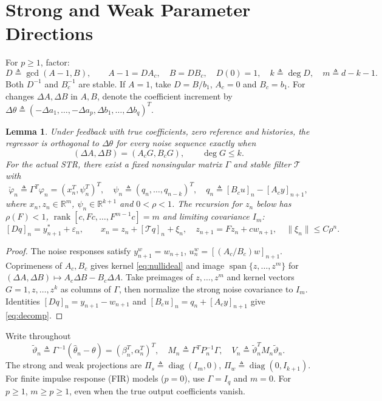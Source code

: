 \documentclass[11pt,reqno]{amsart}
\numberwithin{equation}{section}
\newtheorem{lemma}[theorem]{Lemma}
\theoremstyle{definition}
\theoremstyle{remark}
\newcommand{\thh}{\widehat\theta}
\newcommand{\ph}{\varphi}
\newcommand{\phc}{\check{\varphi}}
\newcommand{\etac}{\widetilde{\vartheta}}
\newcommand{\diag}{\operatorname{diag}}
\begin{document}
\section{Strong and Weak Parameter Directions}\label{sec:geometry}
For $p\ge1$, factor:
\begin{equation*}
 D\triangleq\gcd(A-1,B),\qquad A-1=DA_c,\quad B=DB_c,\quad
 D(0)=1,\quad k\triangleq\deg D,\quad m\triangleq d-k-1.
\end{equation*}
Both $D^{-1}$ and $B_c^{-1}$ are stable. If $A=1$, take $D=B/b_1$, $A_c=0$ and $B_c=b_1$. For changes $\Delta A,\Delta B$ in $A,B$, denote the coefficient increment by $\Delta\theta\triangleq(-\Delta a_1,\ldots,-\Delta a_p,\Delta b_1,\ldots,\Delta b_q)^T$.
\begin{lemma}\label{lem:coords}
Under feedback with true coefficients, zero reference and histories, the regressor is orthogonal to $\Delta\theta$ for every noise sequence exactly when
\begin{equation}\label{eq:nullideal}
 (\Delta A,\Delta B)=(A_cG,B_cG),\qquad\deg G\le k.
\end{equation}
For the actual STR, there exist a fixed nonsingular matrix $\Gamma$ and stable filter $\mathcal T$ with
\begin{equation*}
 \phc_n\triangleq \Gamma^T\ph_n=(x_n^T,\psi_n^T)^T,\quad
 \psi_n\triangleq(q_n,\ldots,q_{n-k})^T,\quad q_n\triangleq[B_cu]_n-[A_cy]_{n+1},
\end{equation*}
where $x_n,z_n\in\mathbb R^m$, $\psi_n\in\mathbb R^{k+1}$ and $0<\rho<1$. The recursion for $z_n$ below has $\rho(F)<1$, $\operatorname{rank}[c,Fc,\ldots,F^{m-1}c]=m$ and limiting covariance $I_m$:
\begin{equation}\label{eq:decomp}
 [Dq]_n=y^*_{n+1}+\varepsilon_n,\qquad
 x_n=z_n+[\mathcal T q]_n+\xi_n,\quad z_{n+1}=Fz_n+cw_{n+1},\quad \|\xi_n\|\le C\rho^n.
\end{equation}
\end{lemma}
\begin{proof}
The noise responses satisfy $y_{n+1}^w=w_{n+1}$, $u_n^w=[(A_c/B_c)w]_{n+1}$. Coprimeness of $A_c,B_c$ gives kernel \eqref{eq:nullideal} and image $\operatorname{span}\{z,\ldots,z^m\}$ for $(\Delta A,\Delta B)\mapsto A_c\Delta B-B_c\Delta A$. Take preimages of $z,\ldots,z^m$ and kernel vectors $G=1,z,\ldots,z^k$ as columns of $\Gamma$, then normalize the strong noise covariance to $I_m$. Identities $[Dq]_n=y_{n+1}-w_{n+1}$ and $[B_cu]_n=q_n+[A_cy]_{n+1}$ give \eqref{eq:decomp}.
\end{proof}
Write throughout
\begin{equation*}
 \etac_n\triangleq\Gamma^{-1}(\thh_n-\theta)=(\beta_n^T,\alpha_n^T)^T,\quad
 M_n\triangleq\Gamma^T P_n^{-1}\Gamma,\quad V_n\triangleq\etac_n^T M_n\etac_n.
\end{equation*}
The strong and weak projections are $\Pi_s\triangleq\diag(I_m,0)$, $\Pi_w\triangleq\diag(0,I_{k+1})$. For finite impulse response (FIR) models ($p=0$), use $\Gamma=I_q$ and $m=0$. For $p\ge1$, $m\ge p\ge1$, even when the true output coefficients vanish.
\end{document}
